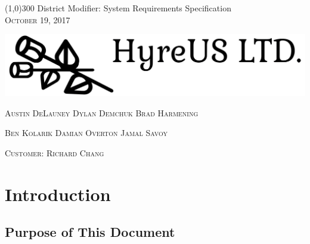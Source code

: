 \documentclass{article}
\begin{document}
\begin{titlepage}

	\begin{center}
 	\line(1,0){300} 
 	\huge{ District Modifier: System Requirements Specification} \\
 	
 	\vspace{1mm} 
 	\textsc{\normalsize October 19, 2017}
 	
 	\vspace{10mm}
	
	\hspace*{-2cm}   
	\includegraphics[scale=.25]{Logo.png}

	\vspace{10mm}
 
 	\textsc{\normalsize Austin DeLauney \quad Dylan Demchuk \quad Brad Harmening}
 	
 	\vspace{2mm}
 	
 	\textsc{\normalsize Ben Kolarik \quad Damian Overton \quad Jamal Savoy}
 
 	\vspace{2mm}
 	
 	\textsc{\normalsize Customer: Richard Chang}
 
 
 	\thispagestyle{empty}
 	
 \end{center}
 \end{titlepage}




\tableofcontents
\thispagestyle{empty}
\cleardoublepage

\setcounter{page}{1}



\section{Introduction}\label{sec:intro}


\subsection{Purpose of This Document}
\end{document}

